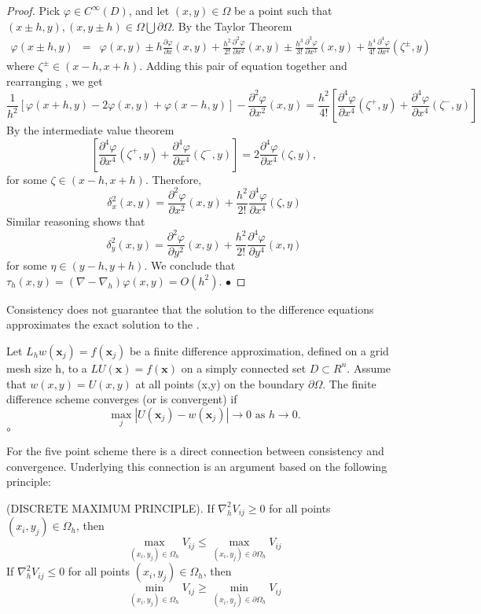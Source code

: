 \begin{proof}
Pick $\varphi \in C^{\infty}(D)$, and let $(x,y) \in \Omega$ be a point such that $(x\pm h, y),(x,y \pm h) \in \Omega\bigcup \partial\Omega$.  By the Taylor Theorem
\begin{eqnarray*}
\varphi(x\pm h,y)&=&\varphi(x,y) \pm h \frac{\partial \varphi}{\partial x}(x,y)+\frac{h^2}{2!}\frac{\partial^2 \varphi}{\partial x^2}(x,y) \pm\frac{h^3}{3!}\frac{\partial^3 \varphi}{\partial x^3}(x,y)+\frac{h^4}{4!}\frac{\partial^4 \varphi}{\partial x^4}(\zeta^{\pm},y)
\end{eqnarray*}
where $\zeta^{\pm} \in (x-h,x+h)$. Adding this pair of equation together and rearranging , we get
\[\frac{1}{h^2}[\varphi(x+h,y)-2\varphi(x,y)+\varphi(x-h,y) ] -\frac{\partial^2 \varphi}{\partial x^2}(x,y)=\frac{h^2}{4!}\left[\frac{\partial^4 \varphi}{\partial x^4}(\zeta^{+},y)+
\frac{\partial^4 \varphi}{\partial x^4}(\zeta^{-},y)
 \right]
\]
By the intermediate value theorem
\[\left[\frac{\partial^4 \varphi}{\partial x^4}(\zeta^{+},y)+
\frac{\partial^4 \varphi}{\partial x^4}(\zeta^{-},y)
 \right]
=2\frac{\partial^4 \varphi}{\partial x^4}(\zeta,y),\]
for some $\zeta \in (x-h,x+h)$.  Therefore,
\[\delta_x^2(x,y)
=\frac{\partial^2 \varphi}{\partial x^2}(x,y)+\frac{h^2}{2!}\frac{\partial^4 \varphi}{\partial x^4}(\zeta,y)
\]
Similar reasoning shows that
\[\delta_y^2(x,y)
=\frac{\partial^2 \varphi}{\partial y^2}(x,y)+\frac{h^2}{2!}\frac{\partial^4 \varphi}{\partial y^4}(x,\eta)
\]
for some $\eta \in (y-h,y+h)$. We conclude that $\tau_h(x,y)=(\nabla-\nabla_h)\varphi(x,y)=O(h^2).$
$\bullet$\end{proof}
Consistency does not guarantee that the solution to the difference equations approximates the exact solution to the . 
\begin{definition}
Let $L_hw(\mathbf{x}_j)=f(\mathbf{x}_j)$ be a finite difference approximation, defined on a grid mesh size h, to a  $LU(\mathbf{x})=f(\mathbf{x})$ on a simply
connected set $D \subset R^n$. Assume that $w(x,y)=U(x,y)$ at all points (x,y) on the boundary $\partial\Omega$.  The finite difference scheme converges (or is convergent) if
\[ \max_j|U(\mathbf{x}_j)-w(\mathbf{x}_j)| \rightarrow 0 \mbox{  as  } h \rightarrow 0.\]
$\circ$
\end{definition}
For the five point scheme there is a direct connection between consistency and convergence.  Underlying this connection is an argument based on the following principle:
\begin{theorem}
(DISCRETE MAXIMUM PRINCIPLE).
If $\nabla^2_hV_{ij}\geq 0$ for all points $(x_i,y_j) \in \Omega_h$, then
\[ \max_{(x_i,y_j)\in\Omega_h}V_{ij}\leq  \max_{(x_i,y_j)\in\partial\Omega_h}V_{ij}\]
If $\nabla^2_hV_{ij}\leq 0$ for all points $(x_i,y_j) \in \Omega_h$, then
\[ \min_{(x_i,y_j)\in\Omega_h}V_{ij}\geq  \min_{(x_i,y_j)\in\partial\Omega_h}V_{ij}\]
\end{theorem}
